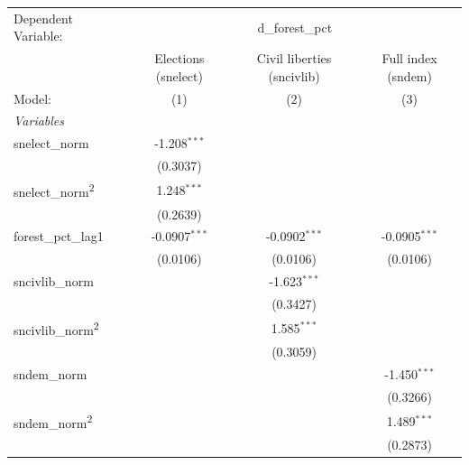 
\begingroup
\centering
\begin{tabular}{lccc}
   \tabularnewline \midrule \midrule
   Dependent Variable: & \multicolumn{3}{c}{d\_forest\_pct}\\
                                       & Elections (snelect) & Civil liberties (sncivlib) & Full index (sndem) \\   
   Model:                              & (1)                 & (2)                        & (3)\\  
   \midrule
   \emph{Variables}\\
   snelect\_norm                       & -1.208$^{***}$      &                            &   \\   
                                       & (0.3037)            &                            &   \\   
   snelect\_norm\textsuperscript{2}    & 1.248$^{***}$       &                            &   \\   
                                       & (0.2639)            &                            &   \\   
   forest\_pct\_lag1                   & -0.0907$^{***}$     & -0.0902$^{***}$            & -0.0905$^{***}$\\   
                                       & (0.0106)            & (0.0106)                   & (0.0106)\\   
   sncivlib\_norm                      &                     & -1.623$^{***}$             &   \\   
                                       &                     & (0.3427)                   &   \\   
   sncivlib\_norm\textsuperscript{2}   &                     & 1.585$^{***}$              &   \\   
                                       &                     & (0.3059)                   &   \\   
   sndem\_norm                         &                     &                            & -1.450$^{***}$\\   
                                       &                     &                            & (0.3266)\\   
   sndem\_norm\textsuperscript{2}      &                     &                            & 1.489$^{***}$\\   
                                       &                     &                            & (0.2873)\\   

\end{tabular}
